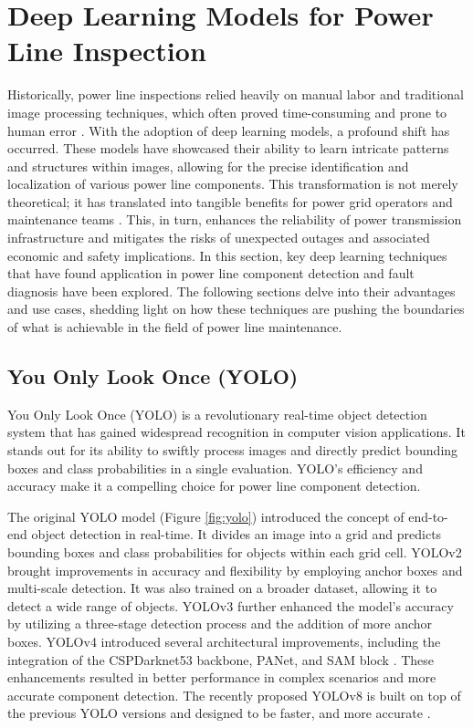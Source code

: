 \section{Deep Learning Models for Power Line Inspection}\label{appendix:dl_models}
Historically, power line inspections relied heavily on manual labor and traditional image processing techniques, which often proved time-consuming and prone to human error \cite{sundaram_deep_2021}. With the adoption of deep learning models, a profound shift has occurred. These models have showcased their ability to learn intricate patterns and structures within images, allowing for the precise identification and localization of various power line components. This transformation is not merely theoretical; it has translated into tangible benefits for power grid operators and maintenance teams \cite{sundaram_deep_2021}. This, in turn, enhances the reliability of power transmission infrastructure and mitigates the risks of unexpected outages and associated economic and safety implications. In this section, key deep learning techniques that have found application in power line component detection and fault diagnosis have been explored. The following sections delve into their advantages and use cases, shedding light on how these techniques are pushing the boundaries of what is achievable in the field of power line maintenance.

\subsection{You Only Look Once (YOLO)}
You Only Look Once (YOLO) \cite{redmon_you_2016} is a revolutionary real-time object detection system that has gained widespread recognition in computer vision applications. It stands out for its ability to swiftly process images and directly predict bounding boxes and class probabilities in a single evaluation. YOLO's efficiency and accuracy make it a compelling choice for power line component detection.

The original YOLO model (Figure \ref{fig:yolo}) introduced the concept of end-to-end object detection in real-time. It divides an image into a grid and predicts bounding boxes and class probabilities for objects within each grid cell. YOLOv2 \cite{redmon_yolo9000_2016} brought improvements in accuracy and flexibility by employing anchor boxes and multi-scale detection. It was also trained on a broader dataset, allowing it to detect a wide range of objects. YOLOv3 \cite{redmon_yolov3_2018} further enhanced the model's accuracy by utilizing a three-stage detection process and the addition of more anchor boxes. YOLOv4 \cite{bochkovskiy_yolov4_2020} introduced several architectural improvements, including the integration of the CSPDarknet53 backbone, PANet, and SAM block \cite{bochkovskiy_yolov4_2020}. These enhancements resulted in better performance in complex scenarios and more accurate component detection. The recently proposed YOLOv8 is built on top of the previous YOLO versions and designed to be faster, and more accurate \cite{jocher_yolo_2023}. 

